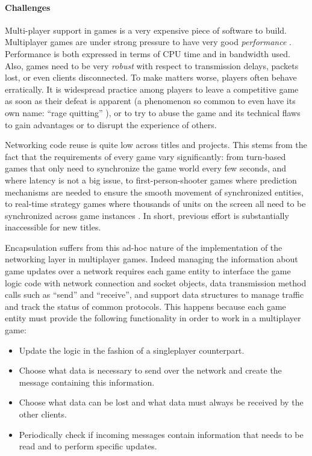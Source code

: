 \paragraph{Challenges}
Multi-player support in games is a very expensive piece of software to build. Multiplayer games are under strong pressure to have very good \textit{performance} \cite{claypool2006latency}. Performance is both expressed in terms of CPU time and in bandwidth used. Also, games need to be very \textit{robust} with respect to transmission delays, packets lost, or even clients disconnected. To make matters worse, players often behave erratically. It is widespread practice among players to leave a competitive game as soon as their defeat is apparent (a phenomenon so common to even have its own name: ``rage quitting'' \cite{rage_quitting}), or to try to abuse the game and its technical flaws to gain advantages or to disrupt the experience of others.

Networking code reuse is quite low across titles and projects. This stems from the fact that the requirements of every game vary significantly: from turn-based games that only need to synchronize the game world every few seconds, and where latency is not a big issue, to first-person-shooter games where prediction mechanisms are needed to ensure the smooth movement of synchronized entities, to real-time strategy games where thousands of units on the screen all need to be synchronized across game instances \cite{smed2002aspects}. In short, previous effort is substantially inaccessible for new titles. 

Encapsulation suffers from this ad-hoc nature of the implementation of the networking layer in multiplayer games. Indeed managing the information about game updates over a network requires each game entity to interface the game logic code with network connection and socket objects, data transmission method calls such as ``send'' and ``receive'', and support data structures to manage traffic and track the status of common protocols. This happens because each game entity must provide the following functionality in order to work in a multiplayer game:

\begin{itemize}
	\item Update the logic in the fashion of a singleplayer counterpart.
	\item Choose what data is necessary to send over the network and create the message containing this information.
	\item Choose what data can be lost and what data must always be received by the other clients.
	\item Periodically check if incoming messages contain information that needs to be read and to perform specific updates.
\end{itemize}

